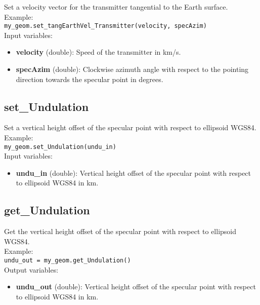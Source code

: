 Set a velocity vector for the transmitter tangential to the Earth surface.\\

Example:\\

\texttt{my\_geom.set\_tangEarthVel\_Transmitter(velocity, specAzim)}\\

Input variables:
\begin{itemize}
\item {\bf velocity} (double): Speed of the transmitter in km/s.
\item {\bf specAzim} (double): Clockwise azimuth angle with respect to the pointing direction towards the specular point in degrees.
\end{itemize}


\subsection{set\_Undulation}

Set a vertical height offset of the specular point with respect to ellipsoid WGS84.\\

Example:\\

\texttt{my\_geom.set\_Undulation(undu\_in)}\\

Input variables:
\begin{itemize}
\item {\bf undu\_in} (double): Vertical height offset of the specular point with respect to ellipsoid WGS84 in km.
\end{itemize}


\subsection{get\_Undulation}

Get the vertical height offset of the specular point with respect to ellipsoid WGS84.\\

Example:\\

\texttt{undu\_out = my\_geom.get\_Undulation()}\\

Output variables:
\begin{itemize}
\item {\bf undu\_out} (double): Vertical height offset of the specular point with respect to ellipsoid WGS84 in km.
\end{itemize}


